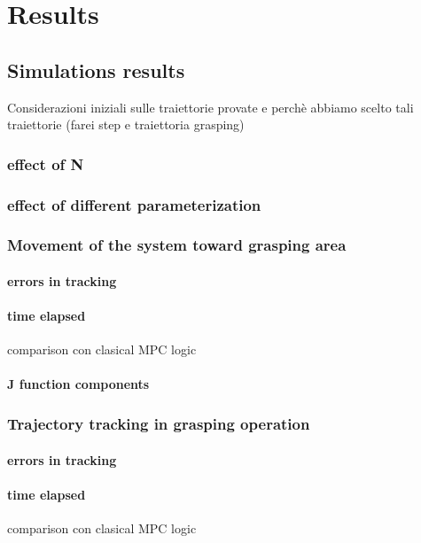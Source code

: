 
\chapter{Results}
\label{chapter7}


\section{Simulations results}
Considerazioni iniziali sulle traiettorie provate e perchè abbiamo scelto tali traiettorie (farei step e traiettoria grasping)
	\subsection{effect of N}
		
	\subsection{effect of different parameterization}
		
	\subsection{Movement of the system toward grasping area}

		\subsubsection{errors in tracking}
			
		\subsubsection{time elapsed}
			comparison con clasical MPC logic
		\subsubsection{J function components}

	\subsection{Trajectory tracking in grasping operation}

		\subsubsection{errors in tracking}
			
		\subsubsection{time elapsed}
			comparison con clasical MPC logic

